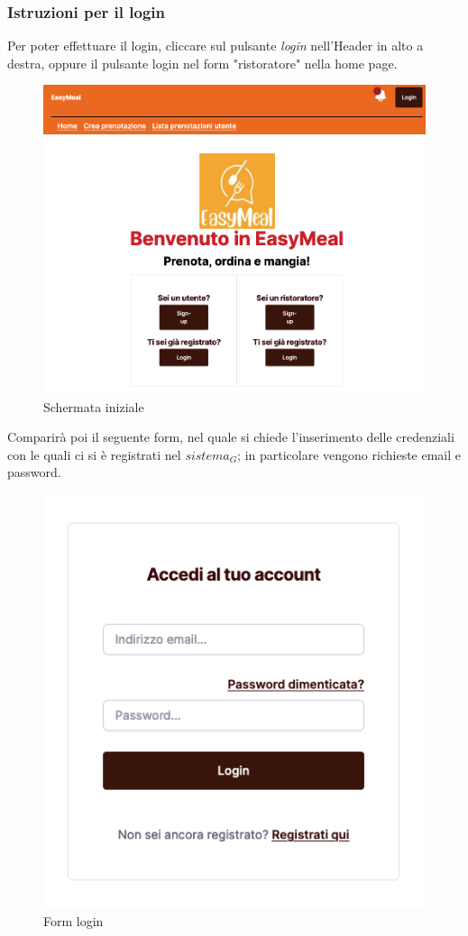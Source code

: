 \subsubsection{Istruzioni per il login}

Per poter effettuare il login, cliccare sul pulsante \emph{login} nell'Header in alto a destra, oppure il pulsante login nel form "ristoratore" nella home page.

\begin{figure}[H]
    \centering
    \includegraphics[width=0.6\linewidth]{img/inizio_login.png}
    \caption{Schermata iniziale}
    \label{fig:form_signup}
\end{figure}

Comparirà poi il seguente form, nel quale si chiede l'inserimento delle credenziali con le quali ci si è registrati nel $\textit{sistema}_G$; in particolare vengono richieste email e password.

\begin{figure}[H]
    \centering
    \includegraphics[width=0.3\linewidth]{img/form_login.png}
    \caption{Form login}
    \label{fig:form_login}
\end{figure}

\newpage
